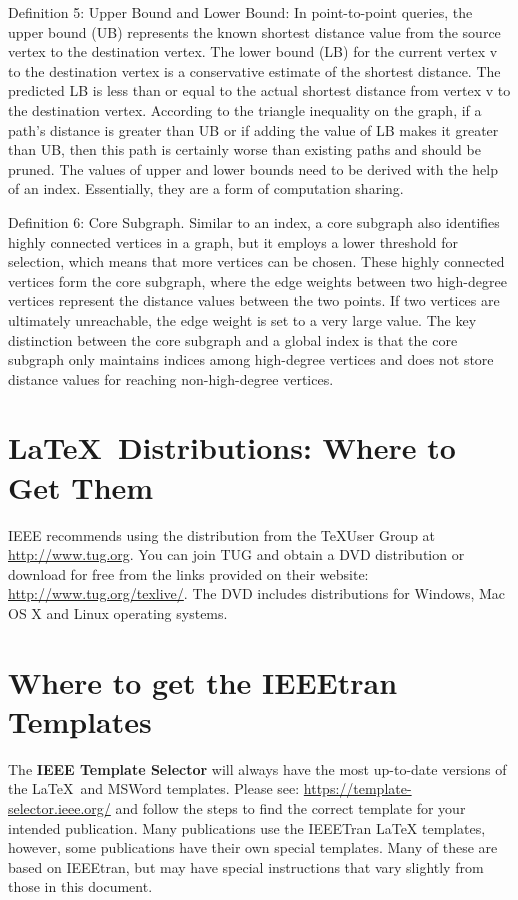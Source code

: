 \documentclass[lettersize,journal]{IEEEtran} %
\begin{document}
Definition 5: Upper Bound and Lower Bound: In point-to-point queries, the upper bound (UB) represents the known shortest distance value from the source vertex to the destination vertex. The lower bound (LB) for the current vertex v to the destination vertex is a conservative estimate of the shortest distance. The predicted LB is less than or equal to the actual shortest distance from vertex v to the destination vertex. According to the triangle inequality on the graph, if a path's distance is greater than UB or if adding the value of LB makes it greater than UB, then this path is certainly worse than existing paths and should be pruned. The values of upper and lower bounds need to be derived with the help of an index. Essentially, they are a form of computation sharing.

Definition 6: Core Subgraph. Similar to an index, a core subgraph also identifies highly connected vertices in a graph, but it employs a lower threshold for selection, which means that more vertices can be chosen. These highly connected vertices form the core subgraph, where the edge weights between two high-degree vertices represent the distance values between the two points. If two vertices are ultimately unreachable, the edge weight is set to a very large value. The key distinction between the core subgraph and a global index is that the core subgraph only maintains indices among high-degree vertices and does not store distance values for reaching non-high-degree vertices.


\section{\LaTeX \ Distributions: Where to Get Them}
\noindent IEEE recommends using the distribution from the \TeX User Group at \url{http://www.tug.org}. You can join TUG and obtain a DVD distribution or download for free  from the links provided on their website: \url{http://www.tug.org/texlive/}. The DVD includes distributions for Windows, Mac OS X and Linux operating systems.
 
\section{Where to get the IEEEtran Templates}
\noindent The {\bf{IEEE Template Selector}} will always have the most up-to-date versions of the \LaTeX\ and MSWord templates. Please see: \url{https://template-selector.ieee.org/} and follow the steps to find the correct template for your intended publication. Many publications use the IEEETran LaTeX templates, however, some publications have their own special templates. Many of these are  based on IEEEtran, but may have special instructions that vary slightly from those in this document.
\end{document}
